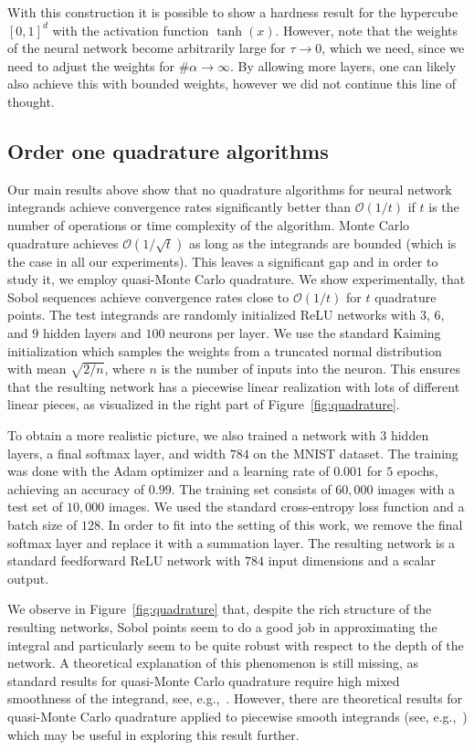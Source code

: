 \documentclass{amsart}[11pt]
\numberwithin{equation}{section}
\newcommand{\order}{\mathcal{O}}
\numberwithin{theorem}{section}
\begin{document}
With this construction it is possible to show a hardness result for the hypercube $[0, 1]^d$ with the activation function $\tanh(x)$. However, note that the weights of the neural network become arbitrarily large for $\tau \to 0$, which we need, since we need to adjust the weights for $\#\alpha \to \infty$. By allowing more layers, one can likely also achieve this with bounded weights, however we did not continue this line of thought.


\subsection{Order one quadrature algorithms}
Our main results above show that no quadrature algorithms for neural network integrands achieve convergence rates significantly better than $\order(1/t)$ if $t$ is the number of operations or time complexity of the algorithm. Monte Carlo quadrature achieves $\order(1/\sqrt{t})$ as long as the integrands are bounded (which is the case in all our experiments). This leaves a significant gap and in order to study it, we employ quasi-Monte Carlo quadrature. We show experimentally, that Sobol sequences achieve convergence rates close to $\order(1/t)$ for $t$ quadrature points.
The test integrands are randomly initialized ReLU networks with $3$, $6$, and $9$ hidden layers and $100$ neurons per layer. 
We use the standard Kaiming initialization which samples the weights from a truncated normal distribution with mean $\sqrt{2/n}$, where $n$ is the number of inputs into the neuron. This ensures that the resulting network has a piecewise linear realization with lots of different linear pieces, as visualized in the right part of Figure~\ref{fig:quadrature}.

To obtain a more realistic picture, we also trained a network with $3$ hidden layers, a final softmax layer, and width $784$ on the MNIST dataset. The training was done with the Adam optimizer and a learning rate of $0.001$ for $5$ epochs, achieving an accuracy of $0.99$. The training set consists of $60,000$ images with a test set of $10,000$ images. We used the standard cross-entropy loss function and a batch size of $128$. In order to fit into the setting of this work, we remove the final softmax layer and replace it with a summation layer. The resulting network is a standard feedforward ReLU network with $784$ input dimensions and a scalar output.

We observe in Figure~\ref{fig:quadrature} that, despite the rich structure of the resulting networks, Sobol points seem to do a good job in approximating the integral and particularly seem to be quite robust with respect to the depth of the network. A theoretical explanation of this phenomenon is still missing, 
as standard results for quasi-Monte Carlo quadrature require high mixed smoothness of the integrand, see, e.g.,~\cite{qmc}. However, there are theoretical results for quasi-Monte Carlo quadrature applied to piecewise smooth integrands (see, e.g.,~\cite{qmc2}) which may be useful in exploring this result further.
\end{document}
